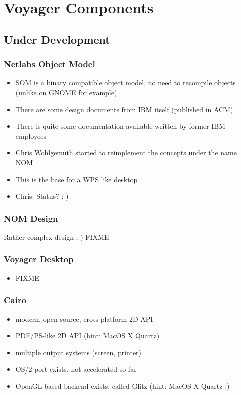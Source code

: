 \documentclass{beamer}
\begin{document}
\section{Voyager Components}
\subsection{Under Development}

\begin{frame}
\frametitle{Netlabs Object Model}
\begin{itemize}[<+->]
  \item SOM is a binary compatible object model, no need to recompile objects (unlike on GNOME for example)
  \item There are some design documents from IBM itself (published in ACM)
  \item There is quite some documentation available written by former IBM employees
  \item Chris Wohlgemuth started to reimplement the concepts under the name NOM
  \item This is the base for a WPS like desktop
  \item Chris: Status? :-)
\end{itemize}
\end{frame}

\begin{frame}
\frametitle{NOM Design}
Rather complex design ;-)
FIXME
\end{frame}

\begin{frame}
\frametitle{Voyager Desktop}
\begin{itemize}[<+->]
  \item FIXME
\end{itemize}
\end{frame}

\begin{frame}
\frametitle{Cairo}
\begin{itemize}[<+->]
  \item modern, open source, cross-platform 2D API
  \item PDF/PS-like 2D API (hint: MacOS X Quartz)
  \item multiple output systems (screen, printer)
  \item OS/2 port exists, not accelerated so far
  \item OpenGL based backend exists, called Glitz (hint: MacOS X Quartz :)
\end{itemize}
\end{frame}
\end{document}
